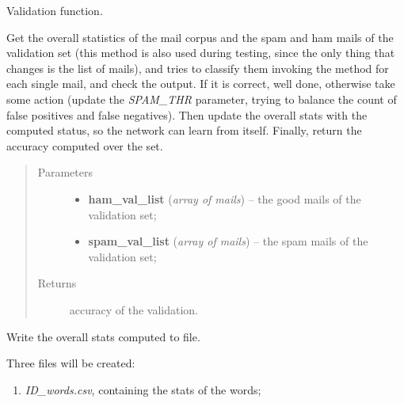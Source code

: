 \documentclass[letterpaper,10pt,english]{sphinxmanual}
\begin{document}
\begin{fulllineitems}

\begin{fulllineitems}
\label{index:naive_bayes.Bayes.validate}
Validation function.

Get the overall statistics of the mail corpus and the spam and ham
mails of the validation set (this method is also used during testing,
since the only thing that changes is the list of mails), and tries to
classify them invoking the {\hyperref[index:classifier.Classifier.classify]{}} method
for each single mail, and check the output. If it is correct, well done,
otherwise take some action (update the \emph{SPAM\_THR} parameter, trying to
balance the count of false positives and false negatives). Then update
the overall stats with the computed status, so the network can learn
from itself. Finally, return the accuracy computed over the set.
\begin{quote}\begin{description}
\item[{Parameters}] \leavevmode\begin{itemize}
\item {} 
\textbf{ham\_val\_list} (\emph{array of mails}) -- the good mails of the validation set;

\item {} 
\textbf{spam\_val\_list} (\emph{array of mails}) -- the spam mails of the validation set;

\end{itemize}

\item[{Returns}] \leavevmode
accuracy of the validation.

\end{description}\end{quote}

\end{fulllineitems}


\begin{fulllineitems}
\label{index:naive_bayes.Bayes.write_bayes}
Write the overall stats computed to file.

Three files will be created:
\begin{enumerate}
\item {} 
\emph{ID\_words.csv}, containing the stats of the words;


\end{enumerate}
\end{fulllineitems}
\end{fulllineitems}
\end{document}
